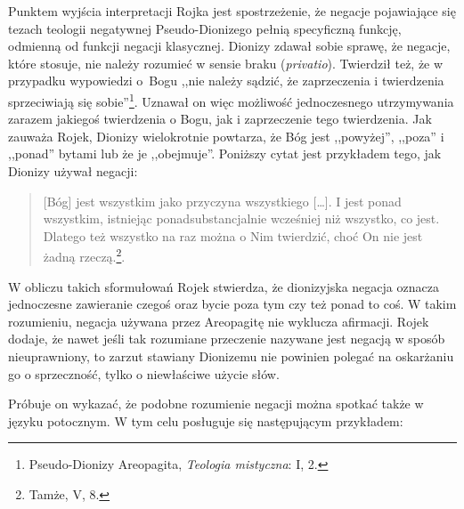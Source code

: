 Punktem wyjścia interpretacji Rojka jest spostrzeżenie, że negacje
pojawiające się tezach teologii negatywnej Pseudo-Dionizego pełnią
specyficzną funkcję, odmienną od funkcji negacji klasycznej. Dionizy
zdawał sobie sprawę, że negacje, które stosuje, nie należy rozumieć w
sensie braku (\textit{privatio}). Twierdził też, że w przypadku
wypowiedzi o~Bogu ,,nie należy sądzić, że zaprzeczenia i twierdzenia
sprzeciwiają się sobie''\footnote{Pseudo-Dionizy Areopagita, \textit{Teologia mistyczna}:
I, 2. }. Uznawał on więc możliwość jednoczesnego utrzymywania
zarazem jakiegoś twierdzenia o Bogu, jak i zaprzeczenie tego twierdzenia. Jak
zauważa Rojek, Dionizy wielokrotnie powtarza, że Bóg jest ,,powyżej'',
,,poza'' i ,,ponad'' bytami lub że je ,,obejmuje''. Poniższy cytat jest
przykładem tego, jak Dionizy używał negacji:



\begin{quote}
    [Bóg] jest wszystkim jako przyczyna wszystkiego […]. I jest ponad
wszystkim, istniejąc ponadsubstancjalnie wcześniej niż wszystko, co
jest. Dlatego też wszystko na raz można o Nim twierdzić, choć On nie
jest żadną rzeczą.\footnote{Tamże, V, 8.}.
\end{quote}





W obliczu takich sformułowań Rojek stwierdza, że dionizyjska negacja
oznacza jednoczesne zawieranie czegoś oraz bycie poza tym czy też ponad to
coś. W takim rozumieniu, negacja używana przez Areopagitę nie wyklucza
afirmacji. Rojek dodaje, że nawet jeśli tak rozumiane przeczenie nazywane jest negacją w sposób nieuprawniony,
to zarzut stawiany Dionizemu nie powinien
polegać na oskarżaniu go o sprzeczność, tylko o niewłaściwe użycie
słów.

Próbuje on wykazać, że podobne rozumienie negacji można spotkać także
w języku potocznym. W tym celu posługuje się następującym przykładem:

